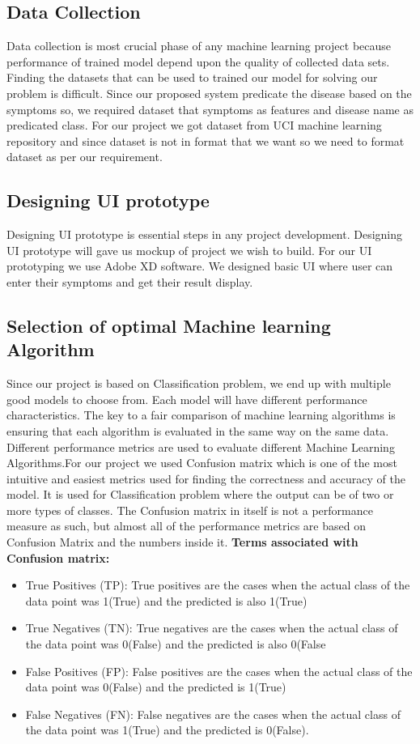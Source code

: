 \subsection{Data Collection}
Data collection is most crucial phase of any machine learning project because performance of trained model depend upon the quality of collected data sets. Finding the datasets that can be used to trained our model for solving our problem is difficult. Since our proposed system predicate the disease based on the symptoms so, we required dataset that symptoms as features and disease name as predicated class. For our project we got dataset from UCI machine learning repository and since dataset is not in format that we want so we need to format dataset as per our requirement.

\subsection{Designing UI prototype}
Designing UI prototype is essential steps in any project development. Designing UI prototype will gave us mockup of project we wish to build. For our UI prototyping we use Adobe XD software. We designed basic UI where user can enter their symptoms and get their result display.

\subsection{Selection of optimal Machine learning Algorithm}
Since our project is based on Classification problem, we end up with multiple good models to choose from. Each model will have different performance characteristics. The key to a fair comparison of machine learning algorithms is ensuring that each algorithm is evaluated in the same way on the same data.
Different performance metrics are used to evaluate different Machine Learning Algorithms.\newline For our project we used Confusion matrix which is  one of the most intuitive and easiest metrics used for finding the correctness and accuracy of the model. It is used for Classification problem where the output can be of two or more types of classes. The Confusion matrix in itself is not a performance measure as such, but almost all of the performance metrics are based on Confusion Matrix and the numbers inside it.\newline
\textbf{Terms associated with Confusion matrix:}
\begin{itemize}
    \item True Positives (TP): True positives are the cases when the actual class of the data point was 1(True) and the predicted is also 1(True)
    \item True Negatives (TN): True negatives are the cases when the actual class of the data point was 0(False) and the predicted is also 0(False 
    \item  False Positives (FP): False positives are the cases when the actual class of the data point was 0(False) and the predicted is 1(True)
    \item False Negatives (FN): False negatives are the cases when the actual class of the data point was 1(True) and the predicted is 0(False).
\end{itemize}

